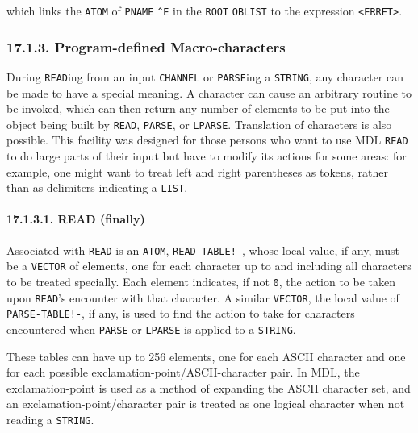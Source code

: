 \documentclass[a4paper,]{article}
\let\oldparagraph\paragraph
\renewcommand{\paragraph}[1]{\oldparagraph{#1}\mbox{}}
\begin{document}
which links the \texttt{ATOM} of \texttt{PNAME} \texttt{\^{}E} in the \texttt{ROOT} \texttt{OBLIST} to the expression
\texttt{\textless{}ERRET\textgreater{}}.

\subsubsection{17.1.3. Program-defined Macro-characters}\label{program-defined-macro-characters}

During \texttt{READ}ing from an input \texttt{CHANNEL} or \texttt{PARSE}ing a \texttt{STRING}, any character can be made to
have a special meaning. A character can cause an arbitrary routine to be invoked, which can then return any number of
elements to be put into the object being built by \texttt{READ}, \texttt{PARSE}, or
\texttt{LPARSE}. Translation of characters is also possible. This facility was designed for those
persons who want to use MDL \texttt{READ} to do large parts of their input but have to modify its actions for some areas:
for example, one might want to treat left and right parentheses as tokens, rather than as delimiters indicating a
\texttt{LIST}.

\paragraph{17.1.3.1. READ (finally)}\label{read-finally}

 Associated with \texttt{READ} is an \texttt{ATOM},
\texttt{READ-TABLE!-}, whose local value, if any, must be a \texttt{VECTOR} of elements,
one for each character up to and including all characters to be treated specially. Each element indicates, if not
\texttt{0}, the action to be taken upon \texttt{READ}'s encounter with that character. A similar \texttt{VECTOR}, the local
value of \texttt{PARSE-TABLE!-}, if any, is used to find the action to take for
characters encountered when \texttt{PARSE} or \texttt{LPARSE} is applied to a \texttt{STRING}.

These tables can have up to 256 elements, one for each ASCII character and one for each possible
exclamation-point/ASCII-character pair. In MDL, the exclamation-point is used as a method of expanding the ASCII character
set, and an exclamation-point/character pair is treated as one logical character when not reading a \texttt{STRING}.
\end{document}

